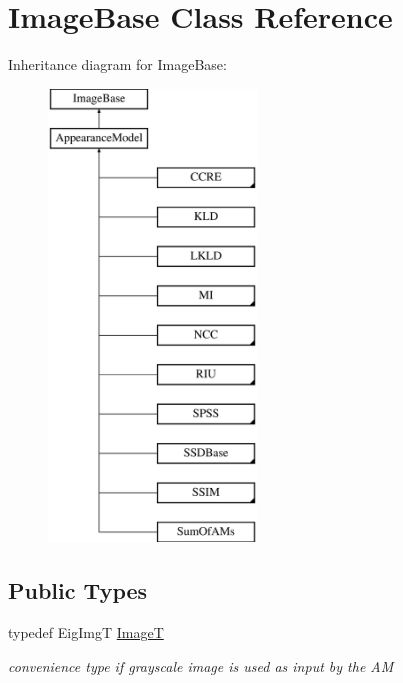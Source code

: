 \hypertarget{classImageBase}{\section{Image\-Base Class Reference}
\label{classImageBase}
}
Inheritance diagram for Image\-Base\-:\begin{figure}[H]
\begin{center}
\leavevmode
\includegraphics[height=12.000000cm]{classImageBase}
\end{center}
\end{figure}
\subsection*{Public Types}
\begin{DoxyCompactItemize}
\item 
\hypertarget{classImageBase_aa0f54a34c4ce87f5b72c7c741145a94e}{typedef Eig\-Img\-T \hyperlink{classImageBase_aa0f54a34c4ce87f5b72c7c741145a94e}{Image\-T}}\label{classImageBase_aa0f54a34c4ce87f5b72c7c741145a94e}

\begin{DoxyCompactList}\small\item\em convenience type if grayscale image is used as input by the A\-M \end{DoxyCompactList}\end{DoxyCompactItemize}
